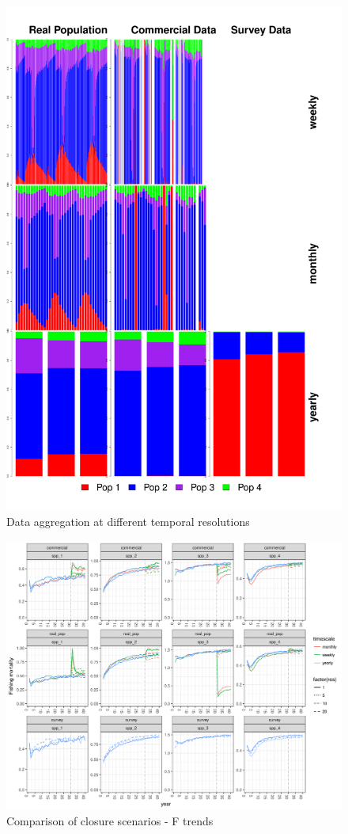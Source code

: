 \documentclass[review]{elsarticle}
\begin{document}
\begin{figure}[!ht]
	\includegraphics[width = \linewidth]{../analysis/Data_Aggregation_time}
	\caption{Data aggregation at different temporal resolutions}
	\label{fig:2}
\end{figure}	


\begin{figure}[!ht]
	\includegraphics[width = \linewidth]{../analysis/F_trends}
	\caption{Comparison of closure scenarios - F trends}
	\label{fig:3}
\end{figure}	
\end{document}
